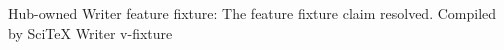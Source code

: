 \documentclass{article}
\begin{document}
Hub-owned Writer feature fixture: The feature fixture claim resolved.
Compiled by SciTeX Writer v-fixture
\end{document}
